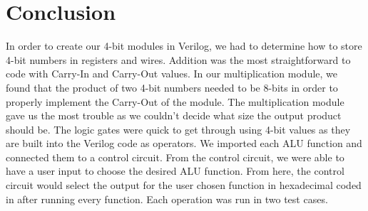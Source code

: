 \documentclass[
	letterpaper, %
	10pt, %
]{CSUniSchoolLabReport}
\begin{document}
\section{Conclusion}
In order to create our 4-bit modules in Verilog, we had to determine how to store 4-bit numbers in registers and wires. Addition was the most straightforward to code with Carry-In and Carry-Out values.  In our multiplication module, we found that the product of two 4-bit numbers needed to be 8-bits in order to properly implement the Carry-Out of the module. The multiplication module gave us the most trouble as we couldn’t decide what size the output product should be. The logic gates were quick to get through using 4-bit values as they are built into the Verilog code as operators. We imported each ALU function and connected them to a control circuit. From the control circuit, we were able to have a user input to choose the desired ALU function. From here, the control circuit would select the output for the user chosen function in hexadecimal coded in after running every function. Each operation was run in two test cases.
\end{document}
